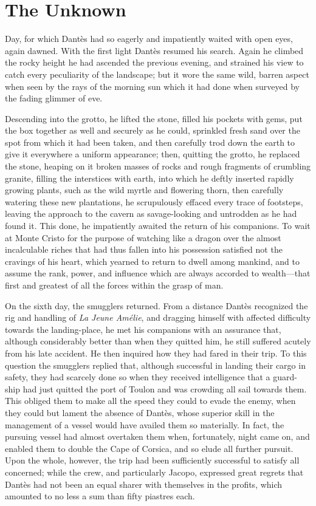 \chapter{The Unknown}

Day, for which Dantès had so eagerly and impatiently waited with open
eyes, again dawned. With the first light Dantès resumed his search.
Again he climbed the rocky height he had ascended the previous evening,
and strained his view to catch every peculiarity of the landscape; but
it wore the same wild, barren aspect when seen by the rays of the
morning sun which it had done when surveyed by the fading glimmer of
eve.

Descending into the grotto, he lifted the stone, filled his pockets
with gems, put the box together as well and securely as he could,
sprinkled fresh sand over the spot from which it had been taken, and
then carefully trod down the earth to give it everywhere a uniform
appearance; then, quitting the grotto, he replaced the stone, heaping
on it broken masses of rocks and rough fragments of crumbling granite,
filling the interstices with earth, into which he deftly inserted
rapidly growing plants, such as the wild myrtle and flowering thorn,
then carefully watering these new plantations, he scrupulously effaced
every trace of footsteps, leaving the approach to the cavern as
savage-looking and untrodden as he had found it. This done, he
impatiently awaited the return of his companions. To wait at Monte
Cristo for the purpose of watching like a dragon over the almost
incalculable riches that had thus fallen into his possession satisfied
not the cravings of his heart, which yearned to return to dwell among
mankind, and to assume the rank, power, and influence which are always
accorded to wealth—that first and greatest of all the forces within the
grasp of man.

On the sixth day, the smugglers returned. From a distance Dantès
recognized the rig and handling of \textit{La Jeune Amélie}, and dragging
himself with affected difficulty towards the landing-place, he met his
companions with an assurance that, although considerably better than
when they quitted him, he still suffered acutely from his late
accident. He then inquired how they had fared in their trip. To this
question the smugglers replied that, although successful in landing
their cargo in safety, they had scarcely done so when they received
intelligence that a guard-ship had just quitted the port of Toulon and
was crowding all sail towards them. This obliged them to make all the
speed they could to evade the enemy, when they could but lament the
absence of Dantès, whose superior skill in the management of a vessel
would have availed them so materially. In fact, the pursuing vessel had
almost overtaken them when, fortunately, night came on, and enabled
them to double the Cape of Corsica, and so elude all further pursuit.
Upon the whole, however, the trip had been sufficiently successful to
satisfy all concerned; while the crew, and particularly Jacopo,
expressed great regrets that Dantès had not been an equal sharer with
themselves in the profits, which amounted to no less a sum than fifty
piastres each.

